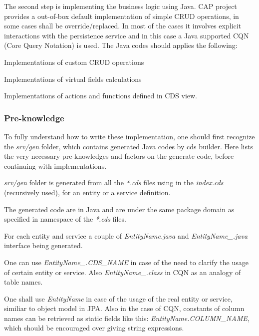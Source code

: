 The second step is implementing the business logic using Java. CAP project provides a out-of-box default implementation of simple CRUD operations, in some cases shall be override/replaced. In most of the cases it involves explicit interactions with the persistence service and in this case a Java supported CQN (Core Query Notation) is used. The Java codes should applies the following:
\begin{compactenum}
	\item Implementations of custom CRUD operations
	\item Implementations of virtual fields calculations
	\item Implementations of actions and functions defined in CDS view.
\end{compactenum}

\subsubsection{Pre-knowledge}
To fully understand how to write these implementation, one should first recognize the \textit{srv/gen} folder, which contains generated Java codes by cds builder. Here lists the very necessary pre-knowledges and factors on the generate code, before continuing with implementations. 
\begin{compactenum}
	\item \textit{srv/gen} folder is generated from all the \textit{*.cds} files using in the \textit{index.cds} (recursively used), for an entity or a service definition.
    \item The generated code are in Java and are under the same package domain as specified in namespace of the \textit{*.cds} files.
    \item For each entity and service a couple of \textit{EntityName.java} and \textit{EntityName\_.java} interface being generated. 
    \item One can use \textit{EntityName\_.CDS\_NAME} in case of the need to clarify the usage of certain entity or service. Also \textit{EntityName\_.class} in CQN as an analogy of table names. 
    \item One shall use \textit{EntityName} in case of the usage of the real entity or service, similiar to object model in JPA. Also in the case of CQN, constants of column names can be retrieved as static fields like this: \textit{EntityName.COLUMN\_NAME}, which should be encouraged over giving string expressions.
\end{compactenum}

